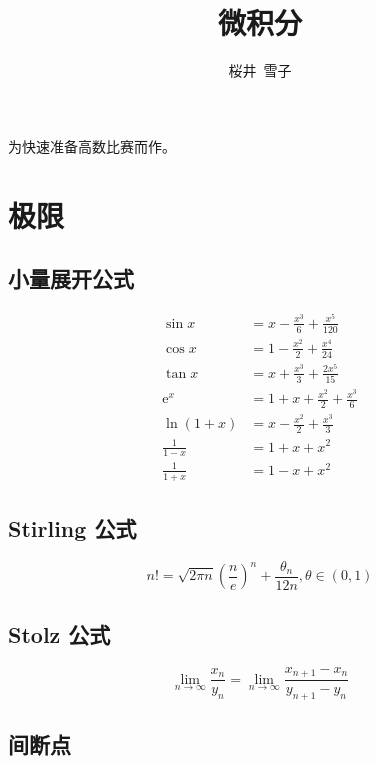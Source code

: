 \documentclass{article}
\title{微积分}
\author{桜井\ 雪子}
\date{}
\begin{document}
\maketitle

为快速准备高数比赛而作。


\section{极限}

\subsection{小量展开公式}

\begin{align}
    \sin x          & = x - \frac{x^3}{6} + \frac{x^5}{120}   \\
    \cos x          & = 1 - \frac{x^2}{2} + \frac{x^4}{24}    \\
    \tan x          & = x + \frac{x^3}{3} + \frac{2 x^5}{15}  \\
    \mathrm{e}^x    & = 1 + x + \frac{x^2}{2} + \frac{x^3}{6} \\
    \ln (1 + x)     & = x - \frac{x^2}{2} + \frac{x^3}{3}     \\
    \frac{1}{1 - x} & = 1 + x + x^2                           \\
    \frac{1}{1 + x} & = 1 - x + x^2
\end{align}

\subsection{Stirling 公式}

\begin{equation}
    n! = \sqrt{2 \pi n} \left(\frac{n}{e}\right)^n + \frac{\theta_n}{12 n}, \theta \in (0, 1)
\end{equation}

\subsection{Stolz 公式}

\begin{equation}
    \lim_{n \to \infty} \frac{x_n}{y_n} = \lim_{n \to \infty} \frac{x_{n+1} - x_n}{y_{n+1} - y_n}
\end{equation}

\subsection{间断点}
\end{document}
